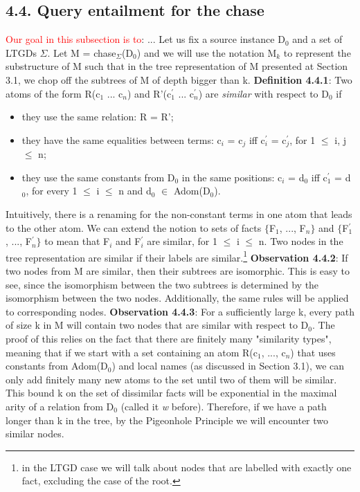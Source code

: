 \documentclass[11pt, a4paper, dvipsnames]{article}
\begin{document}
\subsection{4.4. Query entailment for the chase}
\textcolor{red}{Our goal in this subsection is to}: ...\newline
Let us fix a source instance D$_{0}$ and a set of LTGDs $\Sigma$. Let M = chase$_{\Sigma}$(D$_{0}$) and we will use the notation M$_{k}$ to represent the substructure of M such that in the tree representation of M presented at Section 3.1, we chop off the subtrees of M of depth bigger than k.\newline
\textbf{Definition 4.4.1}: Two atoms of the form R(c$_{1}$ ... c$_{n}$) and R'(c$^{'}_{1}$ ... c$^{'}_{n}$) are \textit{similar} with respect to D$_{0}$ if
\begin{itemize}
	\item they use the same relation: R = R';
	\item they have the same equalities between terms: c$_{i}$ = c$_{j}$ iff c$^{'}_{i}$ = c$^{'}_{j}$, for 1 $\leq$ i, j $\leq$ n;
	\item they use the same constants from D$_{0}$ in the same positions: c$_{i}$ = d$_{0}$ iff c$^{'}_{1}$ = d$_{0}$, for every 1 $\leq$ i $\leq$ n and d$_{0}$ $\in$ Adom(D$_{0}$).
\end{itemize} 
Intuitively, there is a renaming for the non-constant terms in one atom that leads to the other atom. We can extend the notion to sets of facts $\{$F$_{1}$, ..., F$_{n}\}$ and $\{$F$^{'}_{1}$, ..., F$^{'}_{n}\}$ to mean that F$_{i}$ and F$^{'}_{i}$ are similar, for 1 $\leq$ i $\leq$ n. Two nodes in the tree representation are similar if their labels are similar.\footnote{in the LTGD case we will talk about nodes that are labelled with exactly one fact, excluding the case of the root.}\newline
\textbf{Observation 4.4.2}: If two nodes from M are similar, then their subtrees are isomorphic.\newline
This is easy to see, since the isomorphism between the two subtrees is determined by the isomorphism between the two nodes. Additionally, the same rules will be applied to corresponding nodes.\newline
\textbf{Observation 4.4.3}: For a sufficiently large k, every path of size k in M will contain two nodes that are similar with respect to D$_{0}$.\newline
The proof of this relies on the fact that there are finitely many "similarity types", meaning that if we start with a set containing an atom R(c$_{1}$, ..., c$_{n}$) that uses constants from Adom(D$_{0}$) and local names (as discussed in Section 3.1), we can only add finitely many new atoms to the set until two of them will be similar. This bound k on the set of dissimilar facts will be exponential in the maximal arity of a relation from D$_{0}$ (called it \textit{w} before). Therefore, if we have a path longer than k in the tree, by the Pigeonhole Principle we will encounter two similar nodes.\newline
\end{document}
